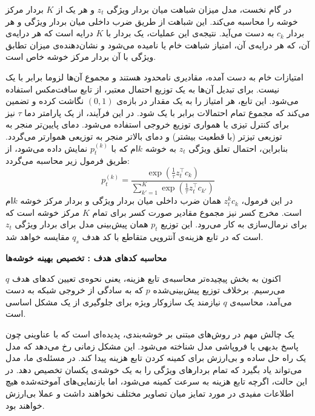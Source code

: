 در گام نخست، مدل میزان شباهت میان بردار ویژگی
$z_t$
و هر یک از 
$K$
بردار مرکز خوشه را محاسبه می‌کند. این شباهت از طریق ضرب داخلی میان بردار ویژگی و هر بردار $c_k$
به دست می‌آید. نتیجه‌ی این عملیات، یک بردار با 
$K$
درایه است که هر درایه‌ی آن، که هر درایه‌ی آن، امتیاز شباهت خام یا  نامیده می‌شود و نشان‌دهنده‌ی میزان تطابق ویژگی با آن بردار مرکز خوشه خاص است.

امتیازات خام به دست آمده، مقادیری نامحدود هستند و مجموع آن‌ها لزوما برابر با یک نیست. برای تبدیل آن‌ها به یک توزیع احتمال معتبر، از تابع سافت‌مکس استفاده می‌شود. این تابع، هر امتیاز را به یک مقدار در بازه‌ی $(0, 1)$ نگاشت کرده و تضمین می‌کند که مجموع تمام احتمالات برابر با یک شود. در این فرآیند، از یک پارامتر دما $\tau$ نیز برای کنترل تیزی یا همواری توزیع خروجی استفاده می‌شود. دمای پایین‌تر منجر به توزیعی تیزتر (با قطعیت بیشتر) و دمای بالاتر منجر به توزیعی هموارتر می‌گردد. بنابراین، احتمال تعلق ویژگی 
$z_t$
به خوشه 
$k$ام که با
$p_t^{(k)}$
نمایش داده می‌شود، از طریق فرمول زیر محاسبه می‌گردد:
\begin{equation}
p_t^{(k)} = \frac{\exp(\frac{1}{\tau} z_t^\top c_k)}{\sum_{k'=1}^{K} \exp(\frac{1}{\tau} z_t^\top c_{k'})}
\label{eq:swav-p-calculation}
\end{equation}
در این فرمول،
$z_t^kc_k$
همان ضرب داخلی میان بردار ویژگی و بردار مرکز خوشه $k$ام است.
مخرج کسر نیز مجموع مقادیر صورت کسر برای تمام 
$K$
مرکز خوشه است که برای نرمال‌سازی به کار می‌رود. این توزیع
$p_t$
همان پیش‌بینی مدل برای بردار ویژگی $z_t$ است که در تابع هزینه‌ی آنتروپی متقاطع با کد هدف
$q_s$
مقایسه خواهد شد.

\vspace{0.5em}
\noindent\textbf{محاسبه کدهای هدف : تخصیص بهینه خوشه‌ها}

اکنون به بخش پیچیده‌تر محاسبه‌ی تابع هزینه، یعنی نحوه‌ی تعیین کدهای هدف 
$q$
می‌رسیم. برخلاف توزیع پیش‌بینی‌شده 
$p$
که به سادگی از خروجی شبکه به دست می‌آمد، محاسبه‌ی 
$q$
نیازمند یک سازوکار ویژه برای جلوگیری از یک مشکل اساسی است.

یک چالش مهم در روش‌های مبتنی بر خوشه‌بندی، پدیده‌ای است که با عناوینی چون پاسخ بدیهی
یا فروپاشی مدل
شناخته می‌شود. این مشکل زمانی رخ می‌دهد که مدل یک راه حل ساده و بی‌ارزش برای کمینه کردن تابع هزینه پیدا کند. در مسئله‌ی ما، مدل می‌تواند یاد بگیرد که تمام بردارهای ویژگی را به یک خوشه‌ی یکسان تخصیص دهد. در این حالت، اگرچه تابع هزینه به سرعت کمینه می‌شود، اما بازنمایی‌های آموخته‌شده هیچ اطلاعات مفیدی در مورد تمایز میان تصاویر مختلف نخواهند داشت و عملا بی‌ارزش خواهند بود.


